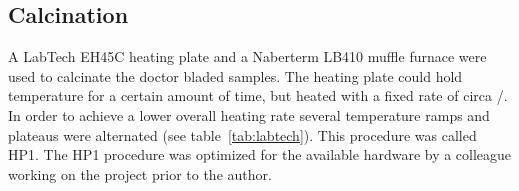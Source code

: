 \subsection{Calcination}
A LabTech EH45C heating plate and a Naberterm LB410 muffle furnace were used to calcinate 
the doctor bladed samples. 
The heating plate could hold temperature for a certain amount of time, but heated with a 
fixed rate of circa /\minutes{}.
In order to achieve a lower overall heating rate several temperature ramps and plateaus 
were alternated (see table~\ref{tab:labtech}). %
This procedure was called HP1.
The HP1 procedure was optimized for the available hardware by a colleague working on the 
project prior to the author.

